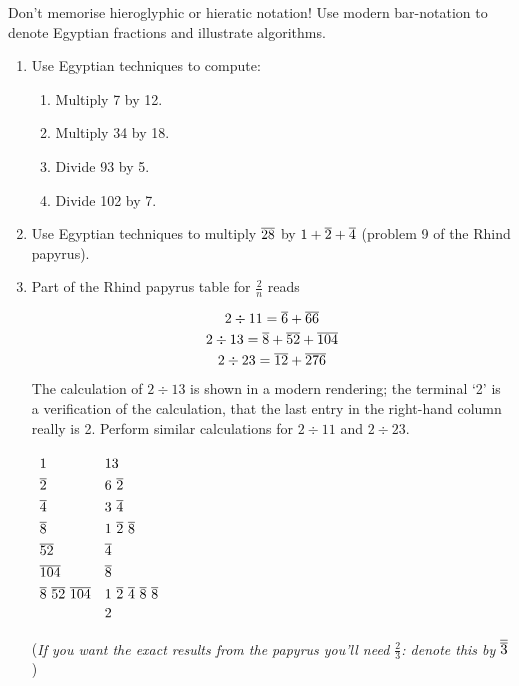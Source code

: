 \begin{exercises*}{}{}
	Don't memorise hieroglyphic or hieratic notation! Use modern bar-notation to denote Egyptian fractions and illustrate algorithms. 
	\begin{enumerate}
	  \item %
	  Use Egyptian techniques to compute:
	  \begin{enumerate}
	    \item Multiply 7 by 12.
	    \item Multiply 34 by 18.
	    \item Divide 93 by 5.
	    \item Divide 102 by 7.
	  \end{enumerate}
	  
	  
	  \item %
	  Use Egyptian techniques to multiply $\overline{28}$ by $1+\overline{2}+\overline{4}$ (problem 9 of the Rhind papyrus).
	  
	  
	  \item %
	  Part of the Rhind papyrus table for $\frac 2n$ reads\par
	  \begin{minipage}[t]{0.7\linewidth}\vspace{-12pt}
		  \begin{gather*}
		  	2\div 11=\overline{6}+\overline{66}\\
		  	2\div 13=\overline{8}+\overline{52}+\overline{104}\\
		  	2\div 23=\overline{12}+\overline{276}
		  \end{gather*}
	  	The calculation of $2\div 13$ is shown in a modern rendering; the terminal `2' is a verification of the calculation, that the last entry in the right-hand column really is 2.\smallbreak
	  	Perform similar calculations for $2\div 11$ and $2\div 23$.
	  \end{minipage}
	  \hfill
	  \begin{minipage}[t]{0.25\linewidth}\vspace{-27pt}
	  	\hfill$\def\arraystretch{1.3}
	  	\begin{array}{l@{\quad}l@{}}
	  		1
			  &13\\
				\cl 2
				&6\ \cl{2}\\
				\cl 4
				&3\ \cl 4\\
			  \cl 8
			  &1\ \cl 2\ \cl 8\\
			  \cl{52}
			  &\cl 4\\
			  \cl{104}
			  &\cl 8\\
			 	\cl 8\ \cl{52}\ \cl{104}
			 	&1\ \cl 2\ \cl 4\ \cl 8\ \cl 8\\[-2pt]
			  &2
	  	\end{array}$
	  \end{minipage}\par
	  (\emph{If you want the exact results from the papyrus you'll need $\frac 23$: denote this by $\overline{\overline{3}}$})
	  


\end{enumerate}
\end{exercises*}
